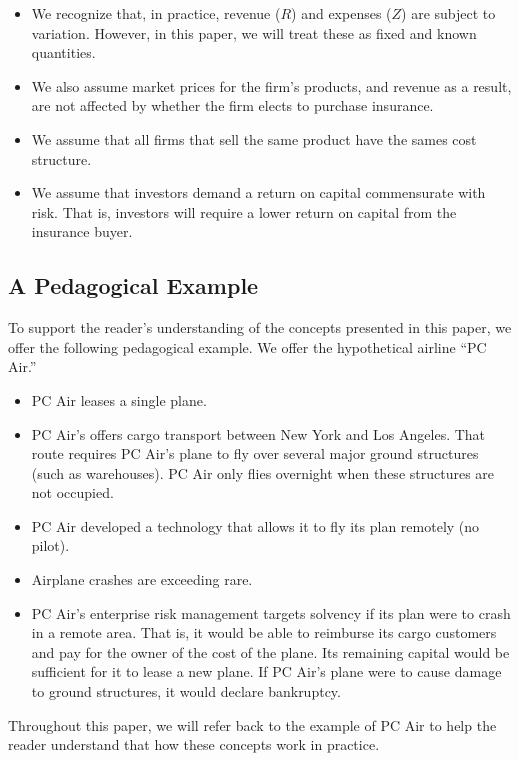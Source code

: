 \documentclass[
]{article}
\begin{document}
\begin{itemize}
\item
  We recognize that, in practice, revenue (\(R\)) and expenses (\(Z\))
  are subject to variation. However, in this paper, we will treat these
  as fixed and known quantities.
\item
  We also assume market prices for the firm's products, and revenue as a
  result, are not affected by whether the firm elects to purchase
  insurance.
\item
  We assume that all firms that sell the same product have the sames
  cost structure.
\item
  We assume that investors demand a return on capital commensurate with
  risk. That is, investors will require a lower return on capital from
  the insurance buyer.
\end{itemize}

\hypertarget{a-pedagogical-example}{%
\subsection{A Pedagogical Example}\label{a-pedagogical-example}}

To support the reader's understanding of the concepts presented in this
paper, we offer the following pedagogical example. We offer the
hypothetical airline ``PC Air.''

\begin{itemize}
\item
  PC Air leases a single plane.
\item
  PC Air's offers cargo transport between New York and Los Angeles. That
  route requires PC Air's plane to fly over several major ground
  structures (such as warehouses). PC Air only flies overnight when
  these structures are not occupied.
\item
  PC Air developed a technology that allows it to fly its plan remotely
  (no pilot).
\item
  Airplane crashes are exceeding rare.
\item
  PC Air's enterprise risk management targets solvency if its plan were
  to crash in a remote area. That is, it would be able to reimburse its
  cargo customers and pay for the owner of the cost of the plane. Its
  remaining capital would be sufficient for it to lease a new plane. If
  PC Air's plane were to cause damage to ground structures, it would
  declare bankruptcy.
\end{itemize}

Throughout this paper, we will refer back to the example of PC Air to
help the reader understand that how these concepts work in practice.
\end{document}
